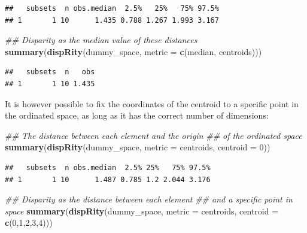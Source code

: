 \documentclass[
]{book}
\newenvironment{Shaded}{\begin{snugshade}}{\end{snugshade}}
\newcommand{\CommentTok}[1]{\textcolor[rgb]{0.56,0.35,0.01}{\textit{#1}}}
\newcommand{\DataTypeTok}[1]{\textcolor[rgb]{0.13,0.29,0.53}{#1}}
\newcommand{\DecValTok}[1]{\textcolor[rgb]{0.00,0.00,0.81}{#1}}
\newcommand{\KeywordTok}[1]{\textcolor[rgb]{0.13,0.29,0.53}{\textbf{#1}}}
\newcommand{\NormalTok}[1]{#1}
\begin{document}
\begin{verbatim}
##   subsets  n obs.median  2.5%   25%   75% 97.5%
## 1       1 10      1.435 0.788 1.267 1.993 3.167
\end{verbatim}

\begin{Shaded}
\begin{Highlighting}[]
\CommentTok{\#\# Disparity as the median value of these distances}
\KeywordTok{summary}\NormalTok{(}\KeywordTok{dispRity}\NormalTok{(dummy\_space, }\DataTypeTok{metric =} \KeywordTok{c}\NormalTok{(median, centroids)))}
\end{Highlighting}
\end{Shaded}

\begin{verbatim}
##   subsets  n   obs
## 1       1 10 1.435
\end{verbatim}

It is however possible to fix the coordinates of the centroid to a specific point in the ordinated space, as long as it has the correct number of dimensions:

\begin{Shaded}
\begin{Highlighting}[]
\CommentTok{\#\# The distance between each element and the origin}
\CommentTok{\#\# of the ordinated space}
\KeywordTok{summary}\NormalTok{(}\KeywordTok{dispRity}\NormalTok{(dummy\_space, }\DataTypeTok{metric =}\NormalTok{ centroids, }\DataTypeTok{centroid =} \DecValTok{0}\NormalTok{))}
\end{Highlighting}
\end{Shaded}

\begin{verbatim}
##   subsets  n obs.median  2.5% 25%   75% 97.5%
## 1       1 10      1.487 0.785 1.2 2.044 3.176
\end{verbatim}

\begin{Shaded}
\begin{Highlighting}[]
\CommentTok{\#\# Disparity as the distance between each element}
\CommentTok{\#\# and a specific point in space}
\KeywordTok{summary}\NormalTok{(}\KeywordTok{dispRity}\NormalTok{(dummy\_space, }\DataTypeTok{metric =}\NormalTok{ centroids,}
                 \DataTypeTok{centroid =} \KeywordTok{c}\NormalTok{(}\DecValTok{0}\NormalTok{,}\DecValTok{1}\NormalTok{,}\DecValTok{2}\NormalTok{,}\DecValTok{3}\NormalTok{,}\DecValTok{4}\NormalTok{)))}
\end{Highlighting}
\end{Shaded}
\end{document}
